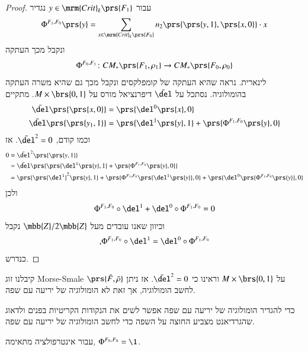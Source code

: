 \documentclass[a4paper,10pt,twoside,openany]{book}
\begin{document}
\begin{proof}
עבור
$y \in \mrm{Crit}_k\prs{F_1}$
נגדיר
\begin{align*}
\Phi^{F_1, F_0}\prs{y} = \sum_{x \in \mrm{Crit}_k\prs{F_0}} n_2\prs{\prs{y,1}, \prs{x,0}} \cdot x
\end{align*}
ונקבל מכך העתקה
\[\Phi^{F_0, F_1} \colon CM_*\prs{F_1, \rho_1} \to CM_*\prs{F_0, \rho_0}\]
לינארית.
נראה שהיא העתקה של קומפלקסים ונקבל מכך גם שהיא משרה העתקה בהומולוגיה.
נסתכל על
$\bar{\del}$
דיפרנציאל מורס על
$M \times \brs{0,1}$.
מתקיים
\begin{align*}
\bar{\del}\prs{\prs{x,0}} &= \prs{\del^0\prs{x}, 0} \\
\bar{\del}\prs{\prs{y_1, 1}} &= \prs{\del^1\prs{y}, 1} + \prs{\Phi^{F_1, F_0}\prs{y}, 0}
\end{align*}
וכמו קודם,
$\bar{\del}^2 = 0$.
אז
\begin{align*}
0 &= \bar{\del}^2\prs{\prs{y,1}}
\\&= \bar{\del} \prs{\prs{\del^1\prs{y}, 1} + \prs{\Phi^{F_1, F_0}\prs{y}, 0}}
\\&= \prs{\prs{\del^1}^2 \prs{y}, 1} + \prs{\Phi^{F_1, F_0} \prs{\del^1\prs{y}},0}
+ \prs{\del^0\prs{\Phi^{F_1, F_0}\prs{y}},0}
\end{align*}
ולכן
\[\Phi^{F_1, F_0} \circ \del^1 + \del^0 \circ \Phi^{F_1, F_0} = 0\]
וכיוון שאנו עובדים מעל
$\mbb{Z}/2\mbb{Z}$
נקבל
\[\text{,} \Phi^{F_1, F_0} \circ \del^1 = \del^0 \circ \Phi^{F_1, F_0}\]
כנדרש.
\end{proof}

\begin{remark}
קיבלנו זוג
\textenglish{Morse-Smale}
$\prs{\bar{F}, \bar{\rho}}$
על
$M \times \brs{0,1}$
וראינו כי
$\bar{\del}^2 = 0$.
אז ניתן לחשב הומולוגיה, אך זאת לא הומולוגיה של יריעה עם שפה.

כדי להגדיר הומולוגיה של יריעה עם שפה אפשר לשים את הנקודות הקריטיות בפנים ולדאוג שהגרדיאנט מצביע החוצה על השפה כדי לחשב הומולוגיה של יריעה עם שפה.
\end{remark}

\begin{proposition}
עבור אינטרפולציה מתאימה,
$\Phi^{F_0, F_0} = \1$.
\end{proposition}
\end{document}
